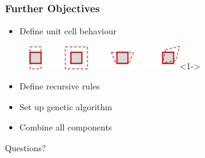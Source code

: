 \documentclass[serif, pdf]{beamer}
\begin{document}
\begin{frame}
    \frametitle{Further Objectives}
    \begin{itemize}
        \item<1-> Define unit cell behaviour
    \end{itemize}
    \begin{figure}
        \includegraphics[height = 1cm]{Unit_Cell_Deformation.jpg}<1->
    \end{figure}
    \begin{itemize}
        \item<2-> Define recursive rules
        \item<3-> Set up genetic algorithm
        \item<4-> Combine all components
    \end{itemize}
\end{frame}


\begin{frame}
    \begin{center}
        \huge Questions?
    \end{center}
\end{frame}
\end{document}
